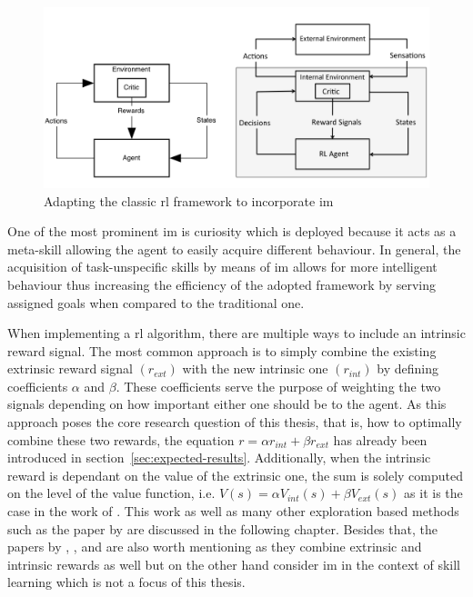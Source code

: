 \documentclass[draft,final]{vutinfth} %
\newcommand{\p}[1]{see p. #1}
\begin{document}
    \begin{figure}[h]
        \centering
        \includegraphics[width=\textwidth]{figures/adapted_rl_framework.png}
        \caption[Adapting the classic \gls{rl} framework to incorporate \gls{im}]{Adapting the classic \gls{rl} framework to incorporate \gls{im}\protect\footnotemark[4]}
        \label{fig:adapted_rl_framework}
    \end{figure}

    \footnotetext[4]{\citep[\p{2}]{singh_intrinsically_2010}}

    One of the most prominent \gls{im} is curiosity which is deployed because it acts as a meta-skill allowing the agent to easily acquire different behaviour.
    In general, the acquisition of task-unspecific skills by means of \gls{im} allows for more intelligent behaviour thus increasing the efficiency of the adopted framework by serving assigned goals when compared to the traditional one.

    When implementing a \gls{rl} algorithm, there are multiple ways to include an intrinsic reward signal.
    The most common approach is to simply combine the existing extrinsic reward signal $(r_{ext})$ with the new intrinsic one $(r_{int})$ by defining coefficients $\alpha$ and $\beta$.
    These coefficients serve the purpose of weighting the two signals depending on how important either one should be to the agent.
    As this approach poses the core research question of this thesis, that is, how to optimally combine these two rewards, the equation $r = \alpha r_{int} + \beta r_{ext}$ has already been introduced in section~\ref{sec:expected-results}.
    Additionally, when the intrinsic reward is dependant on the value of the extrinsic one, the sum is solely computed on the level of the value function, i.e. $V(s)=\alpha V_{int}(s) + \beta V_{ext}(s)$ as it is the case in the work of \citet{kim_curiosity-bottleneck_2019-1}.
    This work as well as many other exploration based methods such as the paper by \citet{burda_exploration_2018} are discussed in the following chapter.
    Besides that, the papers by \citeauthor{gregor_variational_2016}, \citeauthor{vezhnevets_feudal_2017}, and \citeauthor{huang_learning_2019} are also worth mentioning as they combine extrinsic and intrinsic rewards as well but on the other hand consider \gls{im} in the context of skill learning which is not a focus of this thesis.
\end{document}
